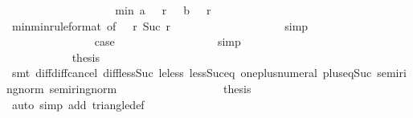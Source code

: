 \begin{isabellebody}
\ \ \ \ \ \ \ \ \ \ \ \ \ \ \isamarkupfalse%
\ \isamarkupfalse%
\ {\isachardoublequoteopen}{\isachardot}{\isachardot}{\isachardot}\ {\isasymle}\ min\ {\isacharparenleft}a\ {\isacharparenleft}{}{}{}{}\ {\isacharminus}\ r\ {\isacharminus}\ {}{\isacharparenright}{\isacharparenright}\ {\isacharparenleft}b\ {\isacharparenleft}{}{}{}{}\ {\isacharminus}\ r\ {\isacharminus}\ {}{\isacharparenright}{\isacharparenright}{\isachardoublequoteclose}\isanewline
\ \ \ \ \ \ \ \ \ \ \ \ \ \ \ \ \isamarkupfalse%
\ min{\isacharunderscore}min{\isacharbrackleft}rule{\isacharunderscore}format{\isacharcomma}\ of\ {\isachardoublequoteopen}{}{}{}{}\ {\isacharminus}\ r{\isachardoublequoteclose}{\isacharbrackright}\ {\isacharbackquoteopen}Suc\ r\ {\isacharless}\ {}{}{}{}{\isacharbackquoteclose}\isanewline
\ \ \ \ \ \ \ \ \ \ \ \ \ \ \ \ \isamarkupfalse%
\ simp\isanewline
\ \ \ \ \ \ \ \ \ \ \ \ \ \ \isamarkupfalse%
\isanewline
\ \ \ \ \ \ \ \ \ \ \ \ \ \ \isamarkupfalse%
\ {\isacharquery}case\isanewline
\ \ \ \ \ \ \ \ \ \ \ \ \ \ \ \ \isamarkupfalse%
\ simp\isanewline
\ \ \ \ \ \ \ \ \ \ \ \ \isamarkupfalse%
\isanewline
\ \ \ \ \ \ \ \ \ \ \isamarkupfalse%
\isanewline
\ \ \ \ \ \ \ \ \ \ \isamarkupfalse%
\ {\isacharquery}thesis\isanewline
\ \ \ \ \ \ \ \ \ \ \ \ \isamarkupfalse%
\ {\isacharparenleft}smt\ diff{\isacharunderscore}diff{\isacharunderscore}cancel\ diff{\isacharunderscore}less{\isacharunderscore}Suc\ le{\isacharunderscore}less\ less{\isacharunderscore}Suc{\isacharunderscore}eq\ one{\isacharunderscore}plus{\isacharunderscore}numeral\ plus{\isacharunderscore}{}{\isacharunderscore}eq{\isacharunderscore}Suc\ semiring{\isacharunderscore}norm{\isacharparenleft}{}{\isacharparenright}\ semiring{\isacharunderscore}norm{\isacharparenleft}{}{\isacharparenright}{\isacharparenright}\isanewline
\ \ \ \ \ \ \ \ \isamarkupfalse%
\isanewline
\ \ \ \ \ \ \ \ \isamarkupfalse%
\ {\isacharquery}thesis\isanewline
\ \ \ \ \ \ \ \ \ \ \isamarkupfalse%
\ {\isacharparenleft}auto\ simp\ add{\isacharcolon}\ triangle{\isacharunderscore}def{\isacharparenright}\isanewline
\ \ \ \ \ \ \isamarkupfalse%
\isanewline
\ \ \ \ \isamarkupfalse%
\isanewline
\ \ \isamarkupfalse%
\isanewline
{}\isamarkupfalse%
%
\endisatagproof
{\isafoldproof}%
%
\isadelimproof
\isanewline
%
\endisadelimproof
%
\isadelimtheory
\isanewline
%
\endisadelimtheory
%
\isatagtheory
{}\isamarkupfalse%
%
\endisatagtheory
{\isafoldtheory}%
%
\isadelimtheory
%
\endisadelimtheory
%
\end{isabellebody}%
